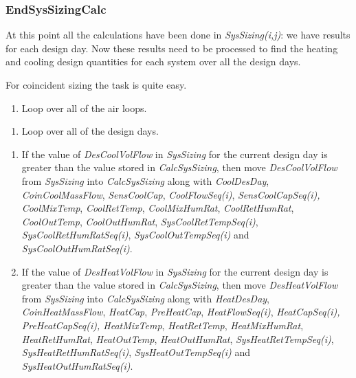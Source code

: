 \subsubsection{EndSysSizingCalc}\label{endsyssizingcalc}

At this point all the calculations have been done in \emph{SysSizing(i,j)}: we have results for each design day. Now these results need to be processed to find the heating and cooling design quantities for each system over all the design days.

For coincident sizing the task is quite easy.

\begin{enumerate}
\def\labelenumi{(\arabic{enumi})}
\tightlist
\item
  Loop over all of the air loops. 
\end{enumerate}

\begin{enumerate}
\def\labelenumi{(\alph{enumi})}
\item Loop over all of the design days.
\end{enumerate}

\begin{enumerate}
\def\labelenumi{(\roman{enumi})}
\item If the value of \emph{DesCoolVolFlow} in \emph{SysSizing} for the current design day is greater than the value stored in \emph{CalcSysSizing}, then move \emph{DesCoolVolFlow} from \emph{SysSizing} into \emph{CalcSysSizing} along with \emph{CoolDesDay}, \emph{CoinCoolMassFlow}, \emph{SensCoolCap}, \emph{CoolFlowSeq(i)}, \emph{SensCoolCapSeq(i),} \emph{CoolMixTemp}, \emph{CoolRetTemp}, \emph{CoolMixHumRat}, \emph{CoolRetHumRat}, \emph{CoolOutTemp}, \emph{CoolOutHumRat}, \emph{SysCoolRetTempSeq(i)}, \emph{SysCoolRetHumRatSeq(i)}, \emph{SysCoolOutTempSeq(i)} and \emph{SysCoolOutHumRatSeq(i)}.

\item If the value of \emph{DesHeatVolFlow} in \emph{SysSizing} for the current design day is greater than the value stored in \emph{CalcSysSizing}, then move \emph{DesHeatVolFlow} from \emph{SysSizing} into \emph{CalcSysSizing} along with \emph{HeatDesDay}, \emph{CoinHeatMassFlow}, \emph{HeatCap}, \emph{PreHeatCap}, \emph{HeatFlowSeq(i)}, \emph{HeatCapSeq(i),} \emph{PreHeatCapSeq(i), HeatMixTemp}, \emph{HeatRetTemp}, \emph{HeatMixHumRat}, \emph{HeatRetHumRat}, \emph{HeatOutTemp}, \emph{HeatOutHumRat}, \emph{SysHeatRetTempSeq(i)}, \emph{SysHeatRetHumRatSeq(i)}, \emph{SysHeatOutTempSeq(i)} and \emph{SysHeatOutHumRatSeq(i)}.

\end{enumerate}


